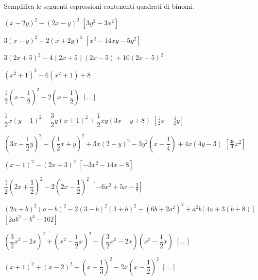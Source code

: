 \begin{esercizio}[\Ast]
 \label{ese:11.8}
Semplifica le seguenti espressioni contenenti quadrati di binomi.

\begin{enumeratea}
 \item $\left(x-2y\right)^{2}-\left(2x-y\right)^{2}$ 
  \hfill $\left[3y^{2}-3x^{2}\right]$
 \item $3(x-y)^{2}-2(x+2y)^{2}$
  \hfill $\left[x^{2}-14xy-5y^{2}\right]$
 \item $3(2x+5)^{2}-4(2x+5)(2x-5)+10(2x-5)^{2}$
 \item $\left(x^{2}+1\right)^{2}-6\left(x^{2}+1\right)+8$
 \item $\dfrac{1}{2}\left(x-\dfrac{1}{2}\right)^{2}-
         2\left(x-\dfrac{1}{2}\right)$
  \hfill $\left[ \dots \right]$
 \item $\dfrac{1}{2}x(y-1)^{2}-\dfrac{3}{2}y(x+1)^{2}+\dfrac{1}{2}{xy}(3x-y+8)$
  \hfill $\left[\frac{1}{2}x-\frac{3}{2}y\right]$
 \item $\left(3x-\dfrac{1}{2}y\right)^{2}-
        \left(\dfrac{1}{2}x+y\right)^{2}+3x(2-y)^{2}
        -3y^{2}\left(x-\dfrac{1}{4}\right)+4x(4y-3)$
  \hfill $\left[\frac{35}{4}x^{2}\right]$
 \item $\left(x-1\right)^{2}-\left(2x+3\right)^{2}$
  \hfill $\left[-3x^{2}-14x-8\right]$
 \item $\dfrac{1}{2}\left(2x+\dfrac{1}{2}\right)^{2}-2\left(2x-
        \dfrac{1}{2}\right)^{2}$
  \hfill $\left[-6x^{2}+5x-\frac{3}{8}\right]$
 \item $(2a+b)^{2}(a-b)^{2}-2(3-b)^{2}(3+b)^{2}-
        (6b+2a^{2})^{2}+a^{2}b[4a+3(b+8)]$
  \hfill $\left[2{ab}^{3}-b^{4}-162\right]$
 \item $\left(\dfrac{3}{2}x^{2}-2x\right)^{2}+\left(x^{2}-
        \dfrac{1}{2}x\right)^{2}-\left(\dfrac{3}{2}x^{2}-2x\right)
        \left(x^{2}-\dfrac{1}{2}x\right)$
  \hfill $\left[ \dots \right]$
 \item $(x+1)^{2}+(x-2)^{2}+\left(x-\dfrac{1}{3}\right)^{2}-
        2x\left(x-\dfrac{1}{2}\right)^{2}$
  \hfill $\left[ \dots \right]$
\end{enumeratea}
\end{esercizio}

\subsubsection*{}


